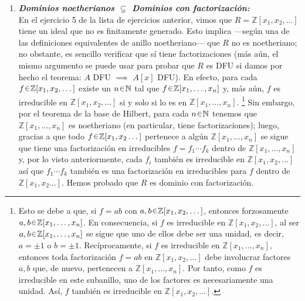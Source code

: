 \begin{sol}
\begin{enumerate}[label={\bfseries\Roman*}., wide, itemsep=1em]
\item{}
\emph{\bfseries Dominios noetherianos $\subsetneq$ Dominios con factorización:}\\
En el ejercicio 5 de la lista de ejercicios anterior, vimos que $R = \mathbb{Z}[x_1,x_2,\dots]$ tiene un ideal que no es finitamente generado. Esto implica ---según una de las definiciones equivalentes de anillo noetheriano--- que $R$ no es noetheriano; no obstante, es sencillo verificar que sí tiene factorizaciones (más aún, el mismo argumento se puede usar para probar que $R$ es DFU si damos por hecho el teorema: $A$ DFU $\implies$ $A[x]$ DFU). En efecto, para cada $f \en \mathbb{Z}[x_1,x_2,\dots]$ existe un $n\en\mathbb{N}$ tal que $f \en \mathbb{Z}[x_1,\dots,x_n]$ y, más aún, $f$ es irreducible en $\mathbb{Z}[x_1,x_2,\dots]$ si y solo si lo es en $\mathbb{Z}[x_1,\dots,x_n]$.%
\footnote{
    Esto se debe a que, si $f = ab$ con $a,b\en\mathbb{Z}[x_1,x_2,\dots]$, entonces forzosamente $a,b \en \mathbb{Z}[x_1,\dots,x_n]$. En consecuencia, si $f$ es irreducible en $\mathbb{Z}[x_1,x_2,\dots]$, al ser $a,b \en \mathbb{Z}[x_1,\dots,x_n]$ se sigue que uno de ellos debe ser una unidad, es decir, $a = \pm 1$ o $b = \pm 1$. Recíprocamente, si $f$ es irreducible en $\mathbb{Z}[x_1,\dots,x_n]$, entonces toda factorización $f = ab$ en $\mathbb{Z}[x_1,x_2,\dots]$ debe involucrar factores $a,b$ que, de nuevo, pertenecen a $\mathbb{Z}[x_1,\dots,x_n]$. Por tanto, como $f$ es irreducible en este subanillo, uno de los factores es necesariamente una unidad. Así, $f$ también es irreducible en $\mathbb{Z}[x_1,x_2,\dots]$.
}%
Sin embargo, por el teorema de la base de Hilbert, para cada $n\en\mathbb{N}$ tenemos que $\mathbb{Z}[x_1,\dots,x_n]$ es noetheriano (en particular, tiene factorizaciones); luego, gracias a que todo $f \en \mathbb{Z}[x_1,x_2\dots]$ pertenece a algún $\mathbb{Z}[x_1,\dots,x_n]$ se sigue que tiene una factorización en irreducibles $f = f_1\cdots f_k$ dentro de $\mathbb{Z}[x_1,\dots,x_n]$ y, por lo visto anteriormente, cada $f_i$ también es irreducible en $\mathbb{Z}[x_1,x_2,\dots]$ así que $f_1\cdots f_k$ también es una factorización en irreducibles para $f$ dentro de $\mathbb{Z}[x_1,x_2\dots]$. Hemos probado que $R$ es dominio con factorización.


\end{enumerate}
\end{sol}

